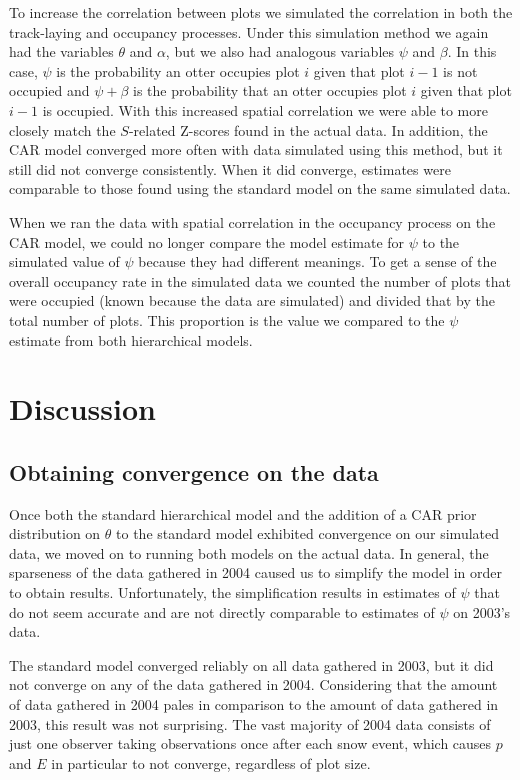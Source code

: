 \documentclass[12pt]{article}
\begin{document}
    To increase the correlation between plots we simulated the correlation
    in both the track-laying and occupancy processes. Under this 
    simulation method we
    again had the variables $\theta$ and $\alpha$, but we also had analogous
    variables $ \psi$ and $\beta$. In this case, $\psi$ is the probability an
    otter occupies plot $i$ given that plot $i-1$ is not occupied and $\psi+
    \beta$ is the probability that an otter occupies plot $i$ given that plot
    $i-1$ is occupied. With this increased spatial correlation we were able to
    more closely match the $S$-related Z-scores found in the actual data. In
    addition, the CAR model converged more often with data simulated using this
    method, but it still did not converge consistently. When it did converge,
    estimates were comparable to those found using the standard model on the
    same simulated data.

    When we ran the data with spatial correlation in the occupancy process on
    the CAR model, we could no longer compare the model estimate for $\psi$ to
    the simulated value of $\psi$ because they had different meanings. To get a
    sense of the overall occupancy rate in the simulated data we counted the
    number of plots that were occupied (known because the data are simulated)
    and divided that by the total number of plots. This proportion is the value
    we compared to the $\psi$ estimate from both hierarchical models.

\section{Discussion}

    \subsection{Obtaining convergence on the data}
    Once both the standard hierarchical model and the addition of a CAR prior
    distribution on \(\theta\) to the standard model exhibited convergence on
    our simulated data, we moved on to running both models on the actual data.
    In general, the sparseness of the data gathered in 2004 caused us to
    simplify the model in order to obtain results. Unfortunately, the
    simplification results in estimates of \(\psi\) that do not seem accurate
    and are not directly comparable to estimates of \(\psi\) on 2003's data.

    The standard model converged reliably on all data gathered in 2003, but it
    did not converge on any of the data gathered in 2004. Considering that the
    amount of data gathered in 2004 pales in comparison to the amount of data
    gathered in 2003, this result was not surprising. The vast majority of
    2004 data consists of just one observer taking observations once after
    each snow event, which causes \(p\) and \(E\) in particular to not converge,
    regardless of plot size.
\end{document}
